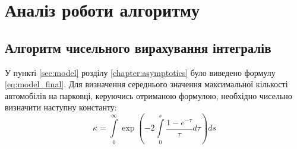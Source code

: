 \section{Аналіз роботи алгоритму}
\jointitles
\subsection{Алгоритм чисельного вирахування інтегралів}

У пункті \ref{sec:model} розділу \ref{chapter:asymptotics} було виведено формулу \eqref{eq:model_final}.
Для визначення середнього значення максимальної кількості автомобілів на парковці, керуючись отриманою формулою, необхідно чисельно визначити наступну константу:
\begin{equation}
\kappa =  \int\limits_0^\infty \exp\left( -2\int\limits_0^s \frac{1 - e^{-\tau}}{\tau} d\tau  \right) ds
\end{equation}

